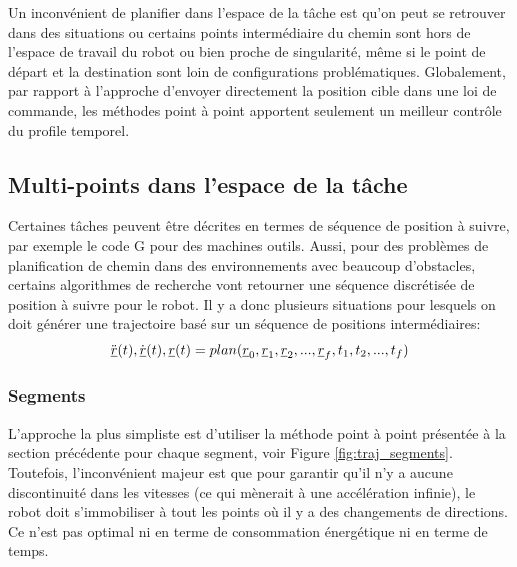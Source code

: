Un inconvénient de planifier dans l'espace de la tâche est qu'on peut se retrouver dans des situations ou certains points intermédiaire du chemin sont hors de l'espace de travail du robot ou bien proche de singularité, même si le point de départ et la destination sont loin de configurations problématiques. Globalement, par rapport à l'approche d'envoyer directement la position cible dans une loi de commande, les méthodes point à point apportent seulement un meilleur contrôle du profile temporel. 

\subsection{Multi-points dans l'espace de la tâche}

Certaines tâches peuvent être décrites en termes de séquence de position à suivre, par exemple le code G pour des machines outils. Aussi, pour des problèmes de planification de chemin dans des environnements avec beaucoup d'obstacles, certains algorithmes de recherche vont retourner une séquence discrétisée de position à suivre pour le robot. Il y a donc plusieurs situations pour lesquels on doit générer une trajectoire basé sur un séquence de positions intermédiaires:
\begin{align}
  \ddot{\underline{r}}(t),\dot{\underline{r}}(t),\underline{r}(t) = plan(\underline{r}_{0}, \underline{r}_{1}, \underline{r}_{2}, ... , \underline{r}_f, t_1, t_2, ... , t_f)
	\label{eq:trajgen}
\end{align}

\subsubsection{Segments}

L'approche la plus simpliste est d'utiliser la méthode point à point présentée à la section précédente pour chaque segment, voir Figure \ref{fig:traj_segments}. Toutefois, l'inconvénient majeur est que pour garantir qu'il n'y a aucune discontinuité dans les vitesses (ce qui mènerait à une accélération infinie), le robot doit s'immobiliser à tout les points où il y a des changements de directions. Ce n'est pas optimal ni en terme de consommation énergétique ni en terme de temps. 

